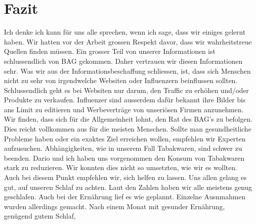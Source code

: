 \chapter{Fazit}
\authortoc{\jonas}{\chapterident}
Ich denke ich kann für uns alle sprechen, wenn ich sage, dass wir einiges gelernt haben.
\newline
Wir hatten vor der Arbeit grossen Respekt davor, dass wir wahrheitstreue Quellen finden müssen. Ein grosser Teil von unserer Informationen ist schlussendlich von BAG gekommen. Daher vertrauen wir diesen Informationen sehr.
\newline
Was wir aus der Informationsbeschaffung schliessen, ist, dass sich Menschen nicht zu sehr von irgendwelche Websiten oder Influenzern beinflussen sollten. Schlussendlich geht es bei Websiten nur darum, den Traffic zu erhöhen und/oder Produkte zu verkaufen. Influenzer sind ausserdem dafür bekannt ihre Bilder bis ans Limit zu editieren und Werbeverträge von unseriösen Firmen anzunehmen. 
\newline
Wir finden, dass sich für die Allgemeinheit lohnt, den Rat des BAG's zu befolgen. Dies reicht vollkommen aus für die meisten Menschen. Sollte man gesundheitliche Probleme haben oder ein exaktes Ziel erreichen wollen, empfehlen wir Experten aufzusuchen.
\newline
\newline
Abhängigkeiten, wie in unserem Fall Tabakwaren, sind schwer zu beenden. Dario und ich haben uns vorgenommen den Konsum von Tabakwaren stark zu reduzieren. Wir konnten dies nicht so umsetzten, wie wir es wollten. Auch bei diesem Punkt empfehlen wir, sich helfen zu lassen.
\newline
Uns allen gelang es gut, auf unseren Schlaf zu achten. Laut den Zahlen haben wir alle meistens genug geschlafen. Auch bei der Ernährung lief es wie geplannt. Einzelne Ausnmahmen wurden allerdings gemacht.
\newline
\newline
Nach einem Monat mit gesunder Ernährung, genügend gutem Schlaf, 
